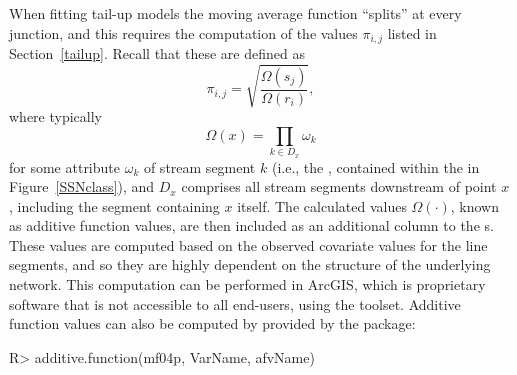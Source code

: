 \documentclass[nojss]{jss}
\renewenvironment{Schunk}{\vspace{\topsep}}{\vspace{\topsep}}
\begin{document}
When fitting tail-up models the moving average function ``splits'' at
every junction, and this requires the computation of the values
$\pi_{i, j}$ listed in Section~\ref{tailup}.  Recall that these are
defined as
\begin{equation}
\pi_{i, j} = \sqrt{\frac{\Omega(s_j)}{\Omega(r_i)}},
\end{equation}
where typically
\begin{equation}
\Omega(x) = \prod_{k \in D_x} \omega_k
\end{equation}
for some attribute $\omega_k$ of stream segment $k$ (i.e., the
 , contained within the
 in Figure~\ref{SSNclass}), and $D_x$
comprises all stream segments downstream of point $x$, including the
segment containing $x$ itself.  The calculated values
$\Omega\left(\cdot\right)$, known as additive function
values, are then included as an additional column to the
 s.  These values are computed based
on the observed covariate values for the line segments, and so they
are highly dependent on the structure of the underlying network.  This
computation can be performed in ArcGIS, which is proprietary software
that is not accessible to all end-users, using the 
toolset. Additive function values can also be computed by
 provided by the  package:

\begin{Schunk}
\begin{Sinput}
R> additive.function(mf04p, VarName, afvName)
\end{Sinput}
\end{Schunk}
\end{document}
